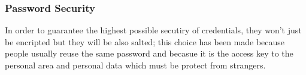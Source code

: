 \subsubsection{Password Security}
In order to guarantee the highest possible secutiry of credentials, they won't just be encripted but they will be also salted; this choice has been made because people usually reuse the same password and becasue it is the access key to the personal area and personal data which must be protect from strangers.

